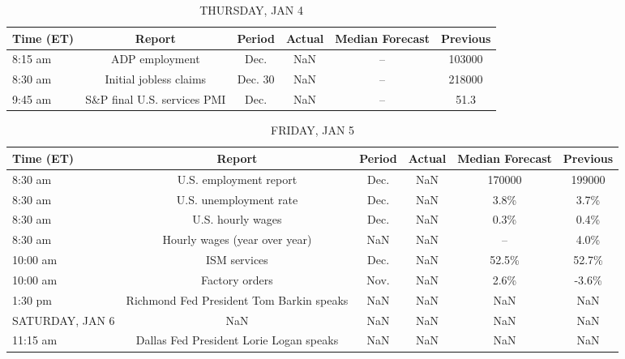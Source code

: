 \documentclass{article}%
\begin{document}
%


\begin{table}[htbp]%
\caption{THURSDAY, JAN 4}%
\centering%
\begin{adjustbox}{width=1\textwidth}%
\begin{tabular}{lccccc}
\toprule
Time (ET) &                      Report &  Period & Actual & Median Forecast & Previous \\
\midrule
  8:15 am &              ADP employment &    Dec. &    NaN &              -- &   103000 \\
  8:30 am &      Initial jobless claims & Dec. 30 &    NaN &              -- &   218000 \\
  9:45 am & S\&P final U.S. services PMI &    Dec. &    NaN &              -- &     51.3 \\
\bottomrule
\end{tabular}
%
\end{adjustbox}%
\end{table}

%


\begin{table}[htbp]%
\caption{FRIDAY, JAN 5}%
\centering%
\begin{adjustbox}{width=1\textwidth}%
\begin{tabular}{lccccc}
\toprule
      Time (ET) &                                   Report & Period & Actual & Median Forecast & Previous \\
\midrule
        8:30 am &                   U.S. employment report &   Dec. &    NaN &          170000 &   199000 \\
        8:30 am &                   U.S. unemployment rate &   Dec. &    NaN &            3.8\% &     3.7\% \\
        8:30 am &                        U.S. hourly wages &   Dec. &    NaN &            0.3\% &     0.4\% \\
        8:30 am &            Hourly wages (year over year) &    NaN &    NaN &              -- &     4.0\% \\
       10:00 am &                             ISM services &   Dec. &    NaN &           52.5\% &    52.7\% \\
       10:00 am &                           Factory orders &   Nov. &    NaN &            2.6\% &    -3.6\% \\
        1:30 pm & Richmond Fed President Tom Barkin speaks &    NaN &    NaN &             NaN &      NaN \\
SATURDAY, JAN 6 &                                      NaN &    NaN &    NaN &             NaN &      NaN \\
       11:15 am &  Dallas Fed President Lorie Logan speaks &    NaN &    NaN &             NaN &      NaN \\
\bottomrule
\end{tabular}
%
\end{adjustbox}%
\end{table}
\end{document}
